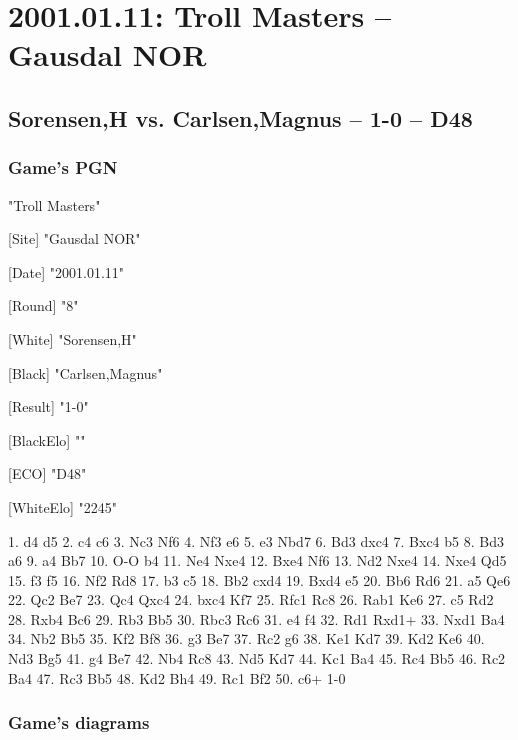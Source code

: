 \documentclass[10pt]{article}
\begin{document}
\section*{2001.01.11: Troll Masters -- Gausdal NOR}

\subsection*{Sorensen,H vs. Carlsen,Magnus -- 1-0 -- D48}

\subsubsection*{Game's PGN}

\begin{flushleft}
[Event] "Troll Masters"

[Site] "Gausdal NOR"

[Date] "2001.01.11"

[Round] "8"

[White] "Sorensen,H"

[Black] "Carlsen,Magnus"

[Result] "1-0"

[BlackElo] ""

[ECO] "D48"

[WhiteElo] "2245"
\end{flushleft}
\parindent 0mm
 
\begin{flushleft}
1. d4 d5 2. c4 c6 3. Nc3 Nf6 4. Nf3 e6 5. e3 Nbd7 6. Bd3 dxc4 7. Bxc4 b5 8. Bd3 a6 9. a4 Bb7 10. O-O b4 11. Ne4 Nxe4 12. Bxe4 Nf6 13. Nd2 Nxe4 14. Nxe4 Qd5 15. f3 f5 16. Nf2 Rd8 17. b3 c5 18. Bb2 cxd4 19. Bxd4 e5 20. Bb6 Rd6 21. a5 Qe6 22. Qc2 Be7 23. Qc4 Qxc4 24. bxc4 Kf7 25. Rfc1 Rc8 26. Rab1 Ke6 27. c5 Rd2 28. Rxb4 Bc6 29. Rb3 Bb5 30. Rbc3 Rc6 31. e4 f4 32. Rd1 Rxd1+ 33. Nxd1 Ba4 34. Nb2 Bb5 35. Kf2 Bf8 36. g3 Be7 37. Rc2 g6 38. Ke1 Kd7 39. Kd2 Ke6 40. Nd3 Bg5 41. g4 Be7 42. Nb4 Rc8 43. Nd5 Kd7 44. Kc1 Ba4 45. Rc4 Bb5 46. Rc2 Ba4 47. Rc3 Bb5 48. Kd2 Bh4 49. Rc1 Bf2 50. c6+ 1-0
\end{flushleft}


\subsubsection*{Game's diagrams}

\newchessgame
{}
\end{document}
